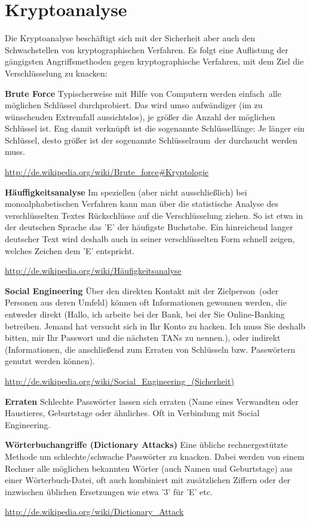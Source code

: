 \section{Kryptoanalyse}

Die Kryptoanalyse beschäftigt sich mit der Sicherheit aber auch den
Schwachstellen von kryptographischen Verfahren. Es folgt eine Auflistung der
gängigsten Angriffsmethoden gegen kryptographische Verfahren, mit dem Ziel die
Verschlüsselung zu knacken:

\begin{compactitem}
\item[\textbf{Brute Force}] Typischerweise mit Hilfe von Computern werden
\glqq einfach\grqq\ alle möglichen Schlüssel durchprobiert. Das wird umso
aufwändiger (im zu wünschenden Extremfall aussichtslos), je größer die Anzahl
der möglichen Schlüssel ist. Eng damit verknüpft ist die sogenannte
Schlüssellänge: Je länger ein Schlüssel, desto größer ist der sogenannte
\glqq Schlüsselraum\grqq\ der durchsucht werden muss.

\url{http://de.wikipedia.org/wiki/Brute_force#Kryptologie}

\item[\textbf{Häuffigkeitsanalyse}] Im speziellen (aber nicht ausschließlich)
bei monoalphabetischen Verfahren kann man über die statistische Analyse des
verschlüsselten Textes Rückschlüsse auf die Verschlüsselung ziehen. So ist etwa
in der deutschen Sprache das 'E' der häufigste Buchstabe. Ein hinreichend
langer deutscher Text wird deshalb auch in seiner verschlüsselten Form schnell
zeigen, welches Zeichen dem 'E' entspricht.

\url{http://de.wikipedia.org/wiki/Häufigkeitsanalyse}

\item[\textbf{Social Engineering}] Über den direkten Kontakt mit der
\glqq Zielperson\grqq\ (oder Personen aus deren Umfeld) können oft Informationen
gewonnen werden, die entweder direkt (\glqq Hallo, ich arbeite bei der Bank, bei
der Sie Online-Banking betreiben. Jemand hat versucht sich in Ihr Konto zu
hacken. Ich muss Sie deshalb bitten, mir Ihr Passwort und die nächsten TANs zu
nennen.\grqq ), oder indirekt (Informationen, die anschließend zum Erraten von
Schlüsseln bzw. Passwörtern genutzt werden können).

\url{http://de.wikipedia.org/wiki/Social_Engineering_(Sicherheit)}

\item[\textbf{Erraten}] Schlechte Passwörter lassen sich erraten (Name eines
Verwandten oder Haustieres, Geburtstage oder ähnliches. Oft in Verbindung mit
\glqq Social Engineering\grqq .

\item[\textbf{Wörterbuchangriffe (Dictionary Attacks)}] Eine übliche
rechnergestützte Methode um schlechte/schwache Passwörter zu knacken. Dabei
werden von einem Rechner alle möglichen bekannten Wörter (auch Namen und
Geburtstage) aus einer Wörterbuch-Datei, oft auch kombiniert mit zusätzlichen
Ziffern oder der inzwischen üblichen Ersetzungen wie etwa '3' für 'E' etc.

\url{http://de.wikipedia.org/wiki/Dictionary_Attack}
\end{compactitem}

